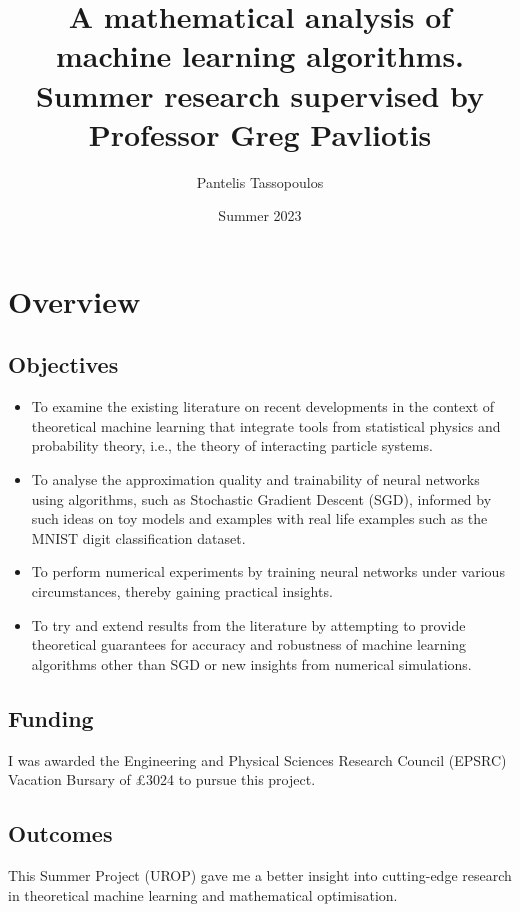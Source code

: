 \documentclass{article}
\title{\Huge A mathematical analysis of machine learning algorithms. \\ 
\huge Summer research supervised by Professor Greg Pavliotis}
\author{\Large Pantelis Tassopoulos}
\date{\Large Summer 2023}
\theoremstyle{mystyle}
\begin{document}
\maketitle
\newpage

\tableofcontents 
\newpage 

\section{Overview}

\subsection{Objectives}

\begin{itemize}
	\item 	To examine the existing literature on recent developments in the context of theoretical machine learning that integrate tools from statistical physics and probability theory, i.e., the theory of interacting particle systems.
	\item 	To analyse the approximation quality and trainability of neural networks using algorithms, such as Stochastic Gradient Descent (SGD), informed by such ideas on toy models and examples with real life examples such as the MNIST digit classification dataset.
	\item 	To perform numerical experiments by training neural networks under various circumstances, thereby gaining practical insights. 
	\item 	To try and extend results from the literature by attempting to provide theoretical guarantees for accuracy and robustness of machine learning algorithms other than SGD or new insights from numerical simulations. 

\end{itemize}

\subsection{Funding}

I was awarded the Engineering and Physical Sciences Research Council (EPSRC) Vacation Bursary of £3024 to pursue this project. 

\subsection{Outcomes}


This Summer Project (UROP) gave me a better insight into cutting-edge research in theoretical machine learning and mathematical optimisation.\\ 
\end{document}
